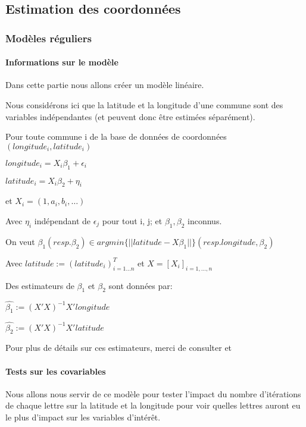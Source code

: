 \documentclass[french]{article}%
\begin{document}
		
	
	\subsection{Estimation des coordonnées}
	
	\subsubsection{Modèles réguliers}
	
	\paragraph*{Informations sur le modèle} 
		
		Dans cette partie nous allons créer un modèle linéaire.
		
		Nous considérons ici que la latitude et la longitude d'une commune sont des variables indépendantes (et peuvent donc être estimées séparément).
		
		Pour toute commune i de la base de données de coordonnées$(longitude_{i},latitude_{i})$
		
		$longitude_{i}=X_{i}\beta_{1} + \epsilon_{i}$
		
		$latitude_{i}=X_{i}\beta_{2} + \eta_{i}$
		
		et $X_{i}=(1,a_{i},b_{i},\dots)$
		
		Avec $\eta_{i}$ indépendant de $\epsilon_{j}$ pour tout i, j; et $\beta_{1}, \beta_{2} $ inconnus.
		
		On veut $\beta_{1} (resp. \beta_{2}) \in argmin\{||latitude-X\beta_{1}||\} (resp. longitude,\beta_{2})$
		
		Avec $latitude:=(latitude_{i})_{i=1\dots n}^{T}$ et $X=[X_{i}]_{i=1,\dots,n}$
		
		Des estimateurs de $\beta_{1}$ et $\beta_{2}$ sont données par:
		
		$\hat{\beta_{1}}:=(X'X)^{-1}X'longitude$ 
		
		$\hat{\beta_{2}}:=(X'X)^{-1}X'latitude$ 
		
		Pour plus de détails sur ces estimateurs, merci de consulter \cite[chap.1-4]{Cornillons2019} et\cite[ch.1]{Donnet}
		
	\paragraph*{Tests sur les covariables}
		
		Nous allons nous servir de ce modèle pour tester l'impact du nombre d'itérations de chaque lettre sur la latitude et la longitude pour voir quelles lettres auront eu le plus d'impact sur les variables d'intérêt.
		
\end{document}
